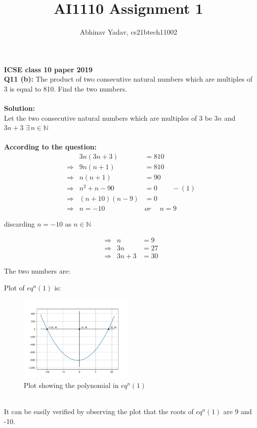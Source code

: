 \documentclass[journal, 12pt, twocolumn]{IEEEtran}
\title{AI1110 Assignment 1}
\author{Abhinav Yadav, cs21btech11002}
\begin{document}
    \maketitle
    \textbf{ICSE class 10 paper 2019}\\
    \textbf{Q11 (b):}
    The product of two consecutive natural numbers which are multiples of 3 is 
    equal to 810. Find the two numbers.\\\\
    \textbf{Solution:}\\
    Let the two consecutive natural numbers which are multiples of $3$ be $3n$ and $3n+3$
    \hspace{5pt} $\exists \hspace{2pt} n \in \mathbb{N}$\\\\
    \textbf{According to the question:}
    \begin{align*}
        &&3n(3n+3) &= 810\\
        &\Rightarrow & 9n(n+1) &= 810\\
        &\Rightarrow & n(n+1) &= 90\\
        &\Rightarrow & n^2+n-90 &= 0\hspace{25pt} -(1)\\
        &\Rightarrow & (n+10)(n-9) &= 0\\
        &\Rightarrow & n=-10 \hspace{15pt} &or \hspace{15pt} n=9
    \end{align*}
    \begin{center}
        discarding $n=-10$ as $n \in \mathbb{N}$
    \end{center}
    \begin{align*}
        &\Rightarrow & n &= 9\\
        &\Rightarrow & 3n &= 27\\
        &\Rightarrow & 3n+3 &= 30\\\\
    \end{align*}
    The two numbers are:\vspace{200pt}
    \pagebreak

    Plot of $eq^n(1)$ is:
    \begin{figure}[h]
        \centering
        \includegraphics[width=0.5\textwidth]{plot.png}
        \caption{Plot showing the polynomial in $eq^n(1)$}
    \end{figure}\\
    It can be easily verified by observing the plot that the roots of $eq^n (1)$ are 9 and -10.\\\\
\end{document}
